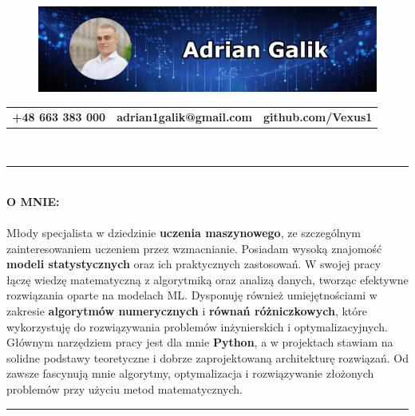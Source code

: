 \documentclass[10pt]{article}
\begin{document}
\begin{figure}[t]
    \hskip-1.55cm\includegraphics[scale=1.3625]{Galik_BANNER.png}
\end{figure}

\vspace*{-4ex}

\noindent
\begin{tabularx}{\textwidth}{l C{12cm} r}
    \textbf{+48 663 383 000} &
    \textbf{adrian1galik@gmail.com} &
    \textbf{github.com/Vexus1}
\end{tabularx} \\
\rule{\textwidth}{1pt} \\

\noindent \fontsize{14pt}{14pt}\selectfont \textbf{\color{Violet}O MNIE:}
\fontsize{10pt}{10pt}\selectfont
\\ \\
\noindent Młody specjalista w dziedzinie \textbf{uczenia maszynowego}, ze szczególnym zainteresowaniem uczeniem przez wzmacnianie.
Posiadam wysoką znajomość \textbf{modeli statystycznych} oraz ich praktycznych zastosowań.
W swojej pracy łączę wiedzę matematyczną z algorytmiką oraz analizą danych, tworząc efektywne rozwiązania oparte na modelach ML. 
Dysponuję również umiejętnościami w zakresie \textbf{algorytmów numerycznych} i \textbf{równań różniczkowych}, które wykorzystuję do rozwiązywania problemów inżynierskich i optymalizacyjnych. 
Głównym narzędziem pracy jest dla mnie \textbf{Python}, a w projektach stawiam na solidne podstawy teoretyczne i dobrze zaprojektowaną architekturę rozwiązań.
Od zawsze fascynują mnie algorytmy, optymalizacja i rozwiązywanie złożonych problemów przy użyciu metod matematycznych.

\noindent \rule{\textwidth}{1pt} \\
\end{document}
